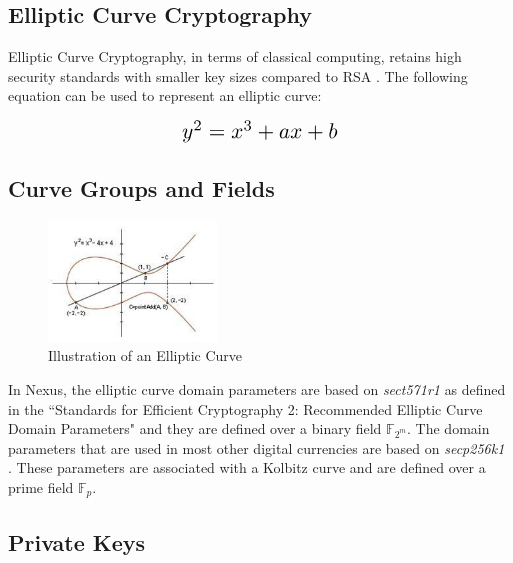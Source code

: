 \documentclass[11pt]{article}
\begin{document}
\subsection{Elliptic Curve Cryptography}

Elliptic Curve Cryptography, in terms of classical computing, retains high security standards with smaller key sizes compared to RSA \cite{wikikeysize}.
The following equation can be used to represent an elliptic curve:

\begin{equation}
\resizebox{.33\hsize}{!}{$y^2 = x^3 + ax + b$}
\end{equation}


\subsection{Curve Groups and Fields}


\begin{figure} %
\vspace{-40pt}
\caption{Illustration of an Elliptic Curve}
    \centering
    \includegraphics[width=0.40\textwidth]{ecc.JPG}
\end{figure}

In Nexus, the elliptic curve domain parameters are based on \textit{sect571r1} \cite{sect571r1} as defined in the ``Standards for Efficient Cryptography 2: Recommended Elliptic Curve Domain Parameters" and they are defined over a binary field $\mathbb{F}_{2^m}$.
The domain parameters that are used in most other digital currencies are based on \textit{secp256k1} \cite{secp256k1}. These parameters are associated with a Kolbitz curve and are defined over a prime field  $\mathbb{F}_p$.

\subsection{Private Keys}
\end{document}
